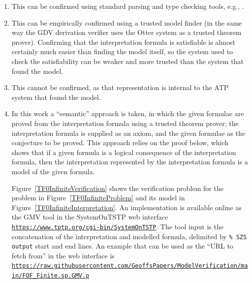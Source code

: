 \documentclass[letterpaper]{article}
\newcommand{\smalltt}[1]{\small \texttt{#1}}
\begin{document}
\begin{enumerate}
\item This can be confirmed using standard parsing and type checking tools, e.g., \cite{VS06,HR15}.
\item This can be empirically confirmed using a trusted model finder (in the same way the GDV 
      derivation verifier \cite{Sut06} uses the Otter system \cite{McC03-Otter} as a trusted 
      theorem prover).
      Confirming that the interpretation formula is satisfiable is almost certainly much 
      easier than finding the model itself, so the system used to check the satisfiability can 
      be weaker and more trusted than the system that found the model.
\item This cannot be confirmed, as that representation is internal to the ATP system that found
      the model.
\item In this work a ``semantic'' approach is taken, in which the given formulae are proved from
      the interpretation formula using a trusted theorem prover; the interpretation formula is 
      supplied as an axiom, and the given formulae as the conjecture to be proved.
      This approach relies on the proof below, which shows that if a given formula is a logical 
      consequence of the interpretation formula, then the interpretation represented by the
      interpretation formula is a model of the given formula.

      Figure~\ref{TF0InfiniteVerification} shows the verification problem for the problem in 
      Figure~\ref{TF0InfiniteProblem} and its model in Figure~\ref{TF0InfiniteInterpretation}.
      An implementation is available online as the GMV tool in the SystemOnTSTP \cite{Sut07-CSR} 
      web interface {\smalltt{\url{https://www.tptp.org/cgi-bin/SystemOnTSTP}}}.
      The tool input is the concatenation of the interpretation and modelled formula,
      delimited by {\smalltt{\% SZS output}} start and end lines.
      An example that can be used as the ``URL to fetch from'' in the web interface is 
      {\smalltt{\url{https://raw.githubusercontent.com/GeoffsPapers/ModelVerification/main/FOF_Finite.sp.GMV.p}}}
\end{enumerate}
\end{document}
